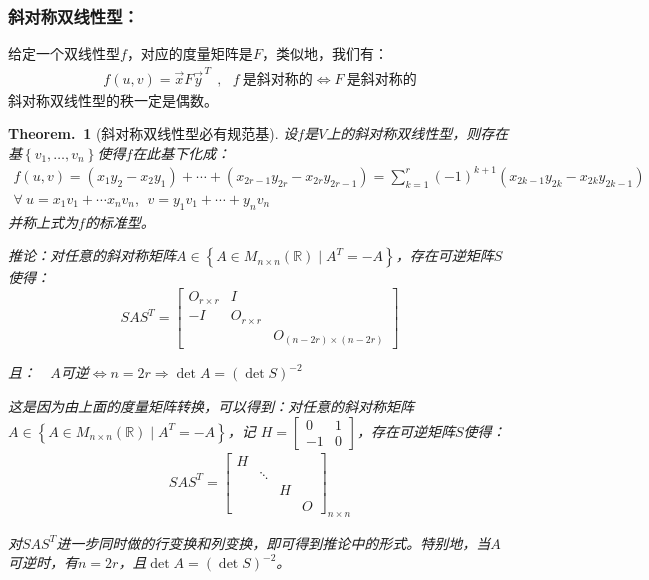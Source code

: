 \documentclass[zihao=-4,UTF8]{report}
\theoremstyle{mystyle} %
\newtheorem{theorem}{Theorem.\,}
\begin{document}
\subsubsection{斜对称双线性型：}
给定一个双线性型$f$，对应的度量矩阵是$F$，类似地，我们有：
\begin{gather*}
    f(u,v) = \vec{x}F\vec{y}^{\, T}\ \ ,\ \ \     f\ \text{是斜对称的} \Longleftrightarrow F\ \text{是斜对称的} 
\end{gather*}
{\color{gray}\small 斜对称双线性型的秩一定是偶数。}
\begin{theorem}[斜对称双线性型必有规范基]\label{斜对称双线性型必有规范基}
    设$f$是$V$上的斜对称双线性型，则存在基$\left\{v_1,\dots,v_n\right\}$使得$f$在此基下化成：
    \begin{gather*}
        f(u,v) = (x_1y_2 - x_2y_1) + \cdots + (x_{2r-1}y_{2r} - x_{2r}y_{2r-1}) = \sum_{k = 1}^{r} (-1)^{k+1}(x_{2k-1}y_{2k} - x_{2k}y_{2k-1})\\
        \forall \ u = x_1v_1 + \cdots x_nv_n,\ \ v = y_1v_1 + \cdots + y_nv_n
    \end{gather*}
    并称上式为$f$的标准型。\par
    推论：对任意的斜对称矩阵$A \in \left\{A\in M_{n\times n }(\mathbb{R}) \mid A^T =- A\right\}$，存在可逆矩阵$S$使得：
    \begin{equation*}
        SAS^T = 
        \begin{bmatrix}  
            O_{r\times r} & I &  \\  
            -I & O_{r\times r} &  \\  
             &  & O_{(n-2r)\times (n-2r)}  
          \end{bmatrix} 
    \end{equation*}\par
    且：\ \ $A$可逆$\Longleftrightarrow n=2r \Longrightarrow \det A = (\det S)^{-2}$\par

    {\color{gray}\small 这是因为由上面的度量矩阵转换，可以得到：对任意的斜对称矩阵$A \in \left\{A\in M_{n\times n }(\mathbb{R}) \mid A^T =- A\right\}$，记
    $H = \begin{bmatrix}
        0&1\\
        -1&0
    \end{bmatrix}$，存在可逆矩阵$S$使得：
    \begin{align*}
        SAS^T = \begin{bmatrix}  
            H &  &  &  \\  
             & \ddots &  &  \\  
             &  & H &  \\  
             &  &  & O  
          \end{bmatrix}_{n \times n} 
    \end{align*}\par
    对$SAS^T$进一步同时做的行变换和列变换，即可得到推论中的形式。特别地，当$A$可逆时，有$n = 2r$，且$\det A = (\det S)^{-2}$。}
\end{theorem}
\end{document}
